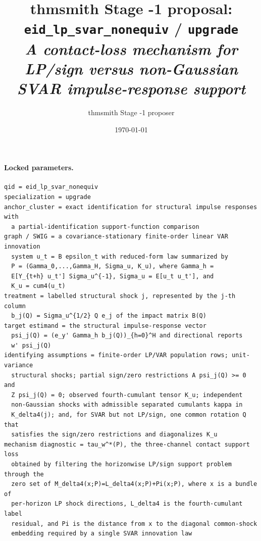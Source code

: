 \documentclass[11pt]{article}
\title{thmsmith Stage -1 proposal: \texttt{eid\_lp\_svar\_nonequiv} / \texttt{upgrade}%
  \\ \large\textit{A contact-loss mechanism for LP/sign versus non-Gaussian SVAR impulse-response support}}
\author{thmsmith Stage -1 proposer}
\date{\today}
\theoremstyle{definition}
\theoremstyle{plain}
\theoremstyle{remark}
\begin{document}
\maketitle


\paragraph{Locked parameters.}
\begin{verbatim}
qid = eid_lp_svar_nonequiv
specialization = upgrade
anchor_cluster = exact identification for structural impulse responses with
  a partial-identification support-function comparison
graph / SWIG = a covariance-stationary finite-order linear VAR innovation
  system u_t = B epsilon_t with reduced-form law summarized by
  P = (Gamma_0,...,Gamma_H, Sigma_u, K_u), where Gamma_h =
  E[Y_{t+h} u_t'] Sigma_u^{-1}, Sigma_u = E[u_t u_t'], and
  K_u = cum4(u_t)
treatment = labelled structural shock j, represented by the j-th column
  b_j(Q) = Sigma_u^{1/2} Q e_j of the impact matrix B(Q)
target estimand = the structural impulse-response vector
  psi_j(Q) = (e_y' Gamma_h b_j(Q))_{h=0}^H and directional reports
  w' psi_j(Q)
identifying assumptions = finite-order LP/VAR population rows; unit-variance
  structural shocks; partial sign/zero restrictions A psi_j(Q) >= 0 and
  Z psi_j(Q) = 0; observed fourth-cumulant tensor K_u; independent
  non-Gaussian shocks with admissible separated cumulants kappa in
  K_delta4(j); and, for SVAR but not LP/sign, one common rotation Q that
  satisfies the sign/zero restrictions and diagonalizes K_u
mechanism diagnostic = tau_w^*(P), the three-channel contact support loss
  obtained by filtering the horizonwise LP/sign support problem through the
  zero set of M_delta4(x;P)=L_delta4(x;P)+Pi(x;P), where x is a bundle of
  per-horizon LP shock directions, L_delta4 is the fourth-cumulant label
  residual, and Pi is the distance from x to the diagonal common-shock
  embedding required by a single SVAR innovation law
\end{verbatim}
\end{document}
